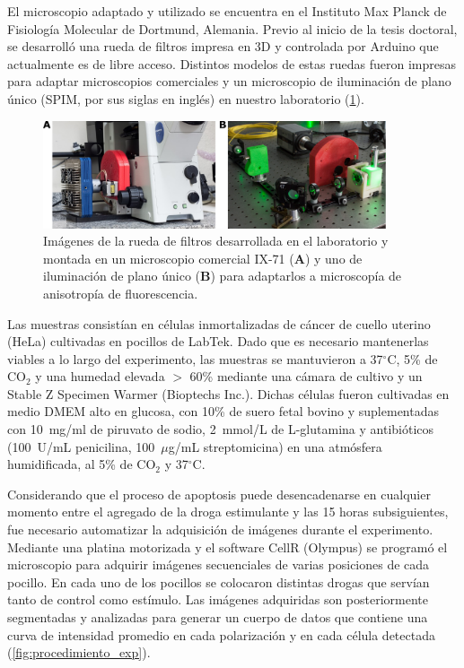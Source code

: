 El microscopio adaptado y utilizado se encuentra en el Instituto Max Planck de Fisiología Molecular de Dortmund, Alemania. Previo al inicio de la tesis doctoral, se desarrolló una rueda de filtros impresa en 3D y controlada por Arduino que actualmente es de libre acceso. Distintos modelos de estas ruedas fueron impresas para adaptar microscopios comerciales y un microscopio de iluminación de plano único (SPIM, por sus siglas en inglés) en nuestro laboratorio (\cref{fig:ruedas}).

\begin{figure}[b]
    \centering
    \includegraphics[width=0.9\textwidth]{img/cap_2/ruedas.pdf}
    \caption{\footnotesize{Imágenes de la rueda de filtros desarrollada en el laboratorio y montada en un microscopio comercial IX-71 (\textbf{A}) y uno de iluminación de plano único (\textbf{B}) para adaptarlos a microscopía de anisotropía de fluorescencia.}}
    \label{fig:ruedas}
\end{figure}

Las muestras consistían en células inmortalizadas de cáncer de cuello uterino (HeLa) cultivadas en pocillos de LabTek. Dado que es necesario mantenerlas viables a lo largo del experimento, las muestras se mantuvieron a 37$^{\circ}$C, 5\% de CO$_2$ y una humedad elevada $>$ 60\% mediante una cámara de cultivo y un Stable Z Specimen Warmer (Bioptechs Inc.). Dichas células fueron cultivadas en medio DMEM alto en glucosa, con 10\% de suero fetal bovino y suplementadas con 10~mg/ml de piruvato de sodio, 2~mmol/L de L-glutamina y antibióticos (100~U/mL penicilina, 100~$\mu$g/mL streptomicina) en una atmósfera humidificada, al 5\% de CO$_2$ y 37$^{\circ}$C.

Considerando que el proceso de apoptosis puede desencadenarse en cualquier momento entre el agregado de la droga estimulante y las 15 horas subsiguientes, fue necesario automatizar la adquisición de imágenes durante el experimento. Mediante una platina motorizada y el software CellR (Olympus) se programó el microscopio para adquirir imágenes secuenciales de varias posiciones de cada pocillo. En cada uno de los pocillos se colocaron distintas drogas que servían tanto de control como estímulo. Las imágenes adquiridas son posteriormente segmentadas y analizadas para generar un cuerpo de datos que contiene una curva de intensidad promedio en cada polarización y en cada célula detectada (\cref{fig:procedimiento_exp}).

